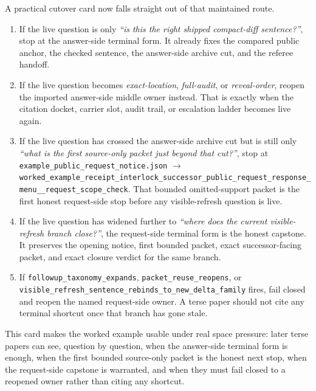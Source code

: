\documentclass[11pt]{article}
\begin{document}
A practical cutover card now falls straight out of that maintained route.
\begin{enumerate}[leftmargin=1.5em]
\item If the live question is only \emph{``is this the right shipped compact-diff sentence?''}, stop at the answer-side terminal form. It already fixes the compared public anchor, the checked sentence, the answer-side archive cut, and the referee handoff.
\item If the live question becomes \emph{exact-location}, \emph{full-audit}, or \emph{reveal-order}, reopen the imported answer-side middle owner instead. That is exactly when the citation docket, carrier slot, audit trail, or escalation ladder becomes live again.
\item If the live question has crossed the answer-side archive cut but is still only \emph{``what is the first source-only packet just beyond that cut?''}, stop at \nolinkurl{example_public_request_notice.json} $\to$ \texttt{worked\_example\_receipt\_interlock\_successor\_public\_request\_response\_menu\_\_request\_scope\_check}. That bounded omitted-support packet is the first honest request-side stop before any visible-refresh question is live.
\item If the live question has widened further to \emph{``where does the current visible-refresh branch close?''}, the request-side terminal form is the honest capstone. It preserves the opening notice, first bounded packet, exact successor-facing packet, and exact closure verdict for the same branch.
\item If \texttt{followup\_taxonomy\_expands}, \texttt{packet\_reuse\_reopens}, or \texttt{visible\_refresh\_sentence\_rebinds\_to\_new\_delta\_family} fires, fail closed and reopen the named request-side owner. A terse paper should not cite any terminal shortcut once that branch has gone stale.
\end{enumerate}
\noindent This card makes the worked example usable under real space pressure: later terse papers can see, question by question, when the answer-side terminal form is enough, when the first bounded source-only packet is the honest next stop, when the request-side capstone is warranted, and when they must fail closed to a reopened owner rather than citing any shortcut.
\end{document}
